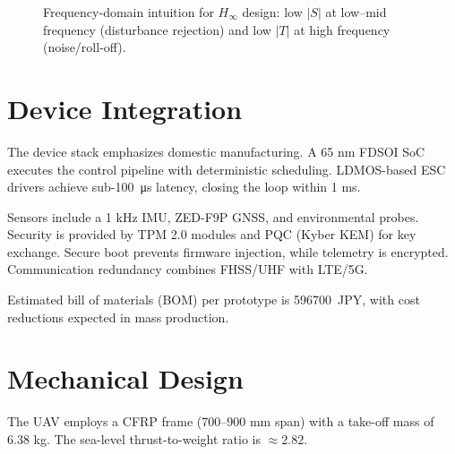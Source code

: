 \documentclass[conference]{IEEEtran}
\begin{document}
\begin{figure}[t]
\centering
{}
\caption{Frequency-domain intuition for $H_\infty$ design: low $|S|$ at low--mid frequency (disturbance rejection) and low $|T|$ at high frequency (noise/roll-off).}
\label{fig:weights}
\end{figure}

\section{Device Integration}
The device stack emphasizes domestic manufacturing.  
A 65 nm FDSOI SoC executes the control pipeline with deterministic 
scheduling. LDMOS-based ESC drivers achieve sub-\SI{100}{\micro\second} 
latency, closing the loop within 1 ms.  

Sensors include a 1 kHz IMU, ZED-F9P GNSS, and environmental probes.  
Security is provided by TPM 2.0 modules and PQC (Kyber KEM) for key 
exchange. Secure boot prevents firmware injection, while telemetry 
is encrypted. Communication redundancy combines FHSS/UHF with LTE/5G.  

Estimated bill of materials (BOM) per prototype is 
\SI{596700}{JPY}, with cost reductions expected in mass production.  

\section{Mechanical Design}
The UAV employs a CFRP frame (700--900 mm span) with a take-off 
mass of 6.38 kg. The sea-level thrust-to-weight ratio is $\approx 2.82$.  
\end{document}
